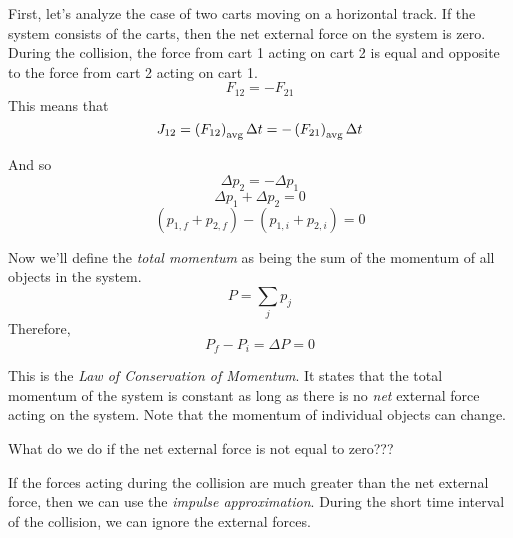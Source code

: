 First, let's analyze the case of two carts moving on a horizontal track. If the system consists of the carts, then the net external force on the system is zero. During the collision, the force from cart 1 acting on cart 2 is equal and opposite to the force from cart 2 acting on cart 1.
$$F_{12}=-F_{21}$$
This means that
$$J_{12}=\left(F_{12}\right)_{\rm avg}\Delta{t}=-\left(F_{21}\right)_{\rm avg}\Delta{t}$$

And so
$$\Delta p_2 = -\Delta p_1$$
$$\Delta p_1 + \Delta p_2 = 0$$
$$(p_{1,f}+p_{2,f})-(p_{1,i}+p_{2,i})=0$$

Now we'll define the \textit{total momentum} as being the sum of the momentum of all objects in the system.
$$P=\sum_j p_j$$
Therefore,
$$P_f-P_i=\Delta P = 0$$

This is the \textit{Law of Conservation of Momentum}. It states that the total momentum of the system is constant as long as there is no \textit{net} external force acting on the system. Note that the momentum of individual objects can change.

What do we do if the net external force is not equal to zero???

If the forces acting during the collision are much greater than the net external force, then we can use the \textit{impulse approximation}. During the short time interval of the collision, we can ignore the external forces.



\clearpage
